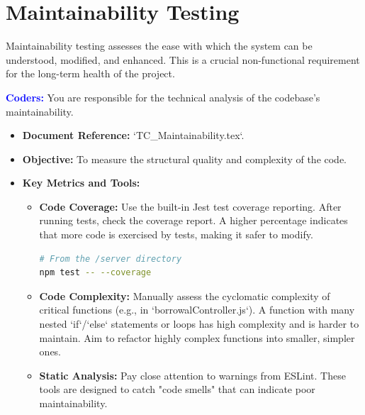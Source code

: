 \documentclass{article}
\newcommand{\role}[1]{\textbf{\textcolor{blue}{#1:}}}
\begin{document}
\section{Maintainability Testing}
Maintainability testing assesses the ease with which the system can be understood, modified, and enhanced. This is a crucial non-functional requirement for the long-term health of the project.

\role{Coders}
You are responsible for the technical analysis of the codebase's maintainability.
\begin{itemize}
    \item \textbf{Document Reference:} `TC\_Maintainability.tex`.
    \item \textbf{Objective:} To measure the structural quality and complexity of the code.
    \item \textbf{Key Metrics and Tools:}
    \begin{itemize}
        \item \textbf{Code Coverage:} Use the built-in Jest test coverage reporting. After running tests, check the coverage report. A higher percentage indicates that more code is exercised by tests, making it safer to modify.
        \begin{lstlisting}[language=bash]
# From the /server directory
npm test -- --coverage
        \end{lstlisting}
        \item \textbf{Code Complexity:} Manually assess the cyclomatic complexity of critical functions (e.g., in `borrowalController.js`). A function with many nested `if`/`else` statements or loops has high complexity and is harder to maintain. Aim to refactor highly complex functions into smaller, simpler ones.
        \item \textbf{Static Analysis:} Pay close attention to warnings from ESLint. These tools are designed to catch "code smells" that can indicate poor maintainability.
    \end{itemize}
\end{itemize}
\end{document}
